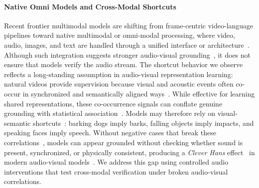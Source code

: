 \documentclass{llmxive}
\begin{document}
\paragraph{Native Omni Models and Cross-Modal Shortcuts}
Recent frontier multimodal models are shifting from frame-centric video-language pipelines toward native multimodal or omni-modal processing, where video, audio, images, and text are handled through a unified interface or architecture~\cite{hurst2024gpt,qwenteam2026qwen35omnitechnicalreport,li2025baichuan}. Although such integration suggests stronger audio-visual grounding~\cite{wu2024nextgpt,zhan2024anygpt,Girdhar2023ImageBindOE}, it does not ensure that models verify the audio stream. The shortcut behavior we observe reflects a long-standing assumption in audio-visual representation learning: natural videos provide supervision because visual and acoustic events often co-occur in synchronized and semantically aligned ways~\cite{Korbar2018CooperativeLO,Morgado2020AudioVisualID,Chen2020VggsoundAL,Senocak2018LearningTL,Alwassel2019SelfSupervisedLB}. While effective for learning shared representations, these co-occurrence signals can conflate genuine grounding with statistical association~\cite{Morgado2021RobustAI,Yuksekgonul2022WhenAW,Thrush2022WinogroundPV}. Models may therefore rely on visual-semantic shortcuts~\cite{agrawal-etal-2016-analyzing,rohrbach-etal-2018-object}: barking dogs imply barks, falling objects imply impacts, and speaking faces imply speech. Without negative cases that break these correlations~\cite{Singh2023LookingSS}, models can appear grounded without checking whether sound is present, synchronized, or physically consistent, producing a \textit{Clever Hans} effect~\cite{Lapuschkin2019UnmaskingCH} in modern audio-visual models~\cite{Buch2022RevisitingT,Wang2024VideoHallucerEI}. We address this gap using controlled audio interventions that test cross-modal verification under broken audio-visual correlations.
\end{document}
